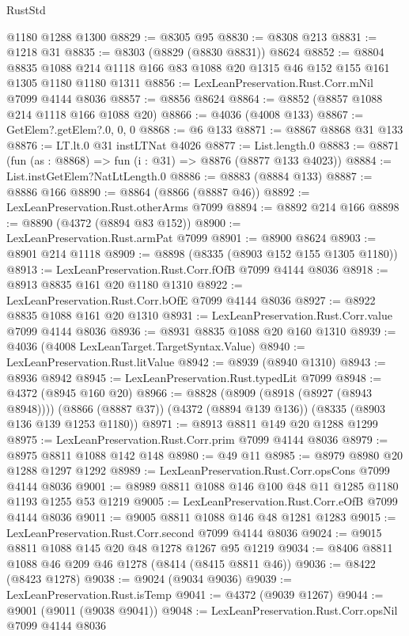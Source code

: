 \begin{lexlean}{RustStd}
\begin{coremodule}
    @1180
    @1288
    @1300
@8829 := @8305 @95
@8830 := @8308 @213
@8831 := @1218 @31
@8835 := @8303 (@8829 (@8830 @8831)) @8624
@8852 := @8804
    @8835
    @1088
    @214
    @1118
    @166
    @83
    @1088
    @20
    @1315
    @46
    @152
    @155
    @161
    @1305
    @1180
    @1180
    @1311
@8856 := LexLeanPreservation.Rust.Corr.mNil @7099 @4144 @8036
@8857 := @8856 @8624
@8864 := @8852 (@8857 @1088 @214 @1118 @166 @1088 @20)
@8866 := @4036 (@4008 @133)
@8867 := GetElem?.getElem?.{0, 0, 0}
@8868 := @6 @133
@8871 := @8867 @8868 @31 @133
@8876 := LT.lt.{0} @31 instLTNat @4026
@8877 := List.length.{0}
@8883 := @8871 (fun (as : @8868) => fun (i : @31) => @8876 (@8877 @133 @4023))
@8884 := List.instGetElem?NatLtLength.{0}
@8886 := @8883 (@8884 @133)
@8887 := @8886 @166
@8890 := @8864 (@8866 (@8887 @46))
@8892 := LexLeanPreservation.Rust.otherArms @7099
@8894 := @8892 @214 @166
@8898 := @8890 (@4372 (@8894 @83 @152))
@8900 := LexLeanPreservation.Rust.armPat @7099
@8901 := @8900 @8624
@8903 := @8901 @214 @1118
@8909 := @8898 (@8335 (@8903 @152 @155 @1305 @1180))
@8913 := LexLeanPreservation.Rust.Corr.fOfB @7099 @4144 @8036
@8918 := @8913 @8835 @161 @20 @1180 @1310
@8922 := LexLeanPreservation.Rust.Corr.bOfE @7099 @4144 @8036
@8927 := @8922 @8835 @1088 @161 @20 @1310
@8931 := LexLeanPreservation.Rust.Corr.value @7099 @4144 @8036
@8936 := @8931 @8835 @1088 @20 @160 @1310
@8939 := @4036 (@4008 LexLeanTarget.TargetSyntax.Value)
@8940 := LexLeanPreservation.Rust.litValue
@8942 := @8939 (@8940 @1310)
@8943 := @8936 @8942
@8945 := LexLeanPreservation.Rust.typedLit @7099
@8948 := @4372 (@8945 @160 @20)
@8966 := @8828
    (@8909 (@8918 (@8927 (@8943 @8948))))
    (@8866 (@8887 @37))
    (@4372 (@8894 @139 @136))
    (@8335 (@8903 @136 @139 @1253 @1180))
@8971 := @8913 @8811 @149 @20 @1288 @1299
@8975 := LexLeanPreservation.Rust.Corr.prim @7099 @4144 @8036
@8979 := @8975 @8811 @1088 @142 @148
@8980 := @49 @11
@8985 := @8979 @8980 @20 @1288 @1297 @1292
@8989 := LexLeanPreservation.Rust.Corr.opsCons @7099 @4144 @8036
@9001 := @8989 @8811 @1088 @146 @100 @48 @11 @1285 @1180 @1193 @1255 @53 @1219
@9005 := LexLeanPreservation.Rust.Corr.eOfB @7099 @4144 @8036
@9011 := @9005 @8811 @1088 @146 @48 @1281 @1283
@9015 := LexLeanPreservation.Rust.Corr.second @7099 @4144 @8036
@9024 := @9015 @8811 @1088 @145 @20 @48 @1278 @1267 @95 @1219
@9034 := @8406 @8811 @1088 @46 @209 @46 @1278 (@8414 (@8415 @8811 @46))
@9036 := @8422 (@8423 @1278)
@9038 := @9024 (@9034 @9036)
@9039 := LexLeanPreservation.Rust.isTemp
@9041 := @4372 (@9039 @1267)
@9044 := @9001 (@9011 (@9038 @9041))
@9048 := LexLeanPreservation.Rust.Corr.opsNil @7099 @4144 @8036

\end{coremodule}
\end{lexlean}
